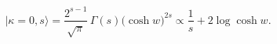 \begin{equation}
|\kappa=0,s\rangle=\frac{2^{s-1}}{\sqrt{\pi}}\,\Gamma(s)\bigl(
\cosh w\bigr)^{2s}\propto \frac{1}{s}+2\log\cosh w.
\label{512}
\end{equation}

